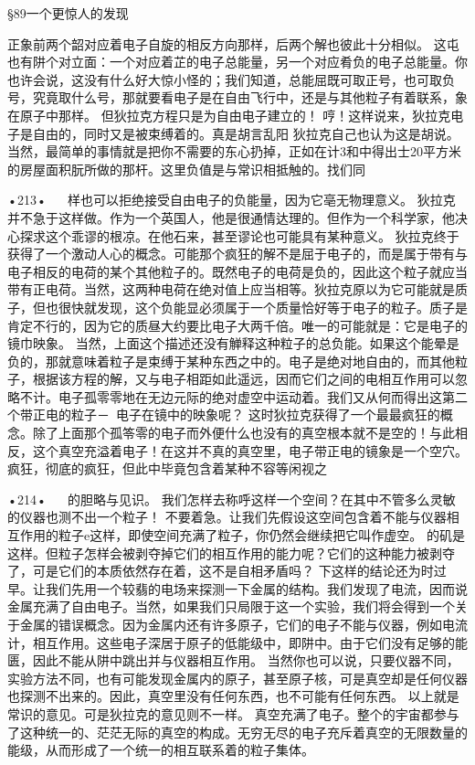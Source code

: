 §89一个更惊人的发现

正象前两个韶对应着电子自旋的相反方向那样，后两个解也彼此十分相似。
这屯也有阱个对立面：一个对应着芷的电子总能量，另一个对应肴负的电子总能量。你也许会说，这没有什么好大惊小怪的；我们知道，总能屈既可取正号，也可取负号，究竟取什么号，那就要看电子是在自由飞行中，还是与其他粒子有着联系，象在原子中那样。
但狄拉克方程只是为自由电子建立的！
哼！这样说来，狄拉克电子是自由的，同时又是被束缚着的。真是胡言乱阳
狄拉克自己也认为这是胡说。当然，最简单的事情就是把你不需要的东心扔掉，正如在计3和中得出士20平方米的房屋面积朊所做的那杆。这里负值是与常识相抵触的。找们同

•213•
  
样也可以拒绝接受自由电子的负能量，因为它亳无物理意义。
狄拉克并不急于这样做。作为一个英国人，他是很通情达理的。但作为一个科学家，他决心探求这个乖谬的根凉。在他石来，甚至谬论也可能具有某种意义。
狄拉克终于获得了一个激动人心的概念。可能那个疯狂的解不是屈于电子的，而是属于带有与电子相反的电荷的某个其他粒子的。既然电子的电荷是负的，因此这个粒子就应当带有正电荷。当然，这两种电荷在绝对值上应当相等。狄拉克原以为它可能就是质子，但也很快就发现，这个负能显必须属于一个质量恰好等于电子的粒子。质子是肯定不行的，因为它的质昼大约要比电子大两千倍。唯一的可能就是：它是电子的镜巾映象。
当然，上面这个描述还没有觯释这种粒子的总负能。如果这个能晕是负的，那就意味着粒子是束缚于某种东西之中的。电子是绝对地自由的，而其他粒子，根据该方程的解，又与电子相距如此遥远，因而它们之间的电相互作用可以忽略不计。电子孤零零地在无边元际的绝对虚空中运动着。我们又从何而得出这第二个带正电的粒子－~电子在镜中的映象呢？
这时狄拉克获得了一个最最疯狂的概念。除了上面那个孤笭零的电子而外便什么也没有的真空根本就不是空的！与此相反，这个真空充溢着电子！在这并不真的真空里，电子带正电的镜象是一个空穴。
疯狂，彻底的疯狂，但此中毕竟包含着某种不容等闲视之

•214•
  
的胆略与见识。
我们怎样去称呼这样一个空间？在其中不管多么灵敏的仪器也测不出一个粒子！
不要着急。让我们先假设这空间包含着不能与仪器相互作用的粒子e这样，即使空间充满了粒子，你仍然会继续把它叫作虚空。
的矶是这样。但粒子怎样会被剥夺掉它们的相互作用的能力呢？它们的这种能力被剥夺了，可是它们的本质依然存在着，这不是自相矛盾吗？
下这样的结论还为时过早。让我们先用一个较翡的电场来探测一下金属的结构。我们发现了电流，因而说金属充满了自由电子。当然，如果我们只局限于这一个实验，我们将会得到一个关于金属的错误概念。因为金属内还有许多原子，它们的电子不能与仪器，例如电流计，相互作用。这些电子深居于原子的低能级中，即阱中。由于它们没有足够的能匮，因此不能从阱中跳出并与仪器相互作用。
当然你也可以说，只要仪器不同，实验方法不同，也有可能发现金属内的原子，甚至原子核，可是真空却是任何仪器也探测不出来的。因此，真空里没有任何东西，也不可能有任何东西。
以上就是常识的意见。可是狄拉克的意见则不一样。
真空充满了电子。整个的宇宙都参与了这种统一的、茫茫无际的真空的构成。无穷无尽的电子充斥着真空的无限数量的能级，从而形成了一个统一的相互联系着的粒子集体。

